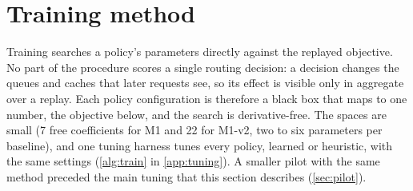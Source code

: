 %

\section{Training method}
\label{sec:training}

Training searches a policy's parameters directly against the replayed objective. No part of the
procedure scores a single routing decision: a decision changes the queues and caches that later
requests see, so its effect is visible only in aggregate over a replay. Each policy
configuration is therefore a black box that maps to one number, the objective below, and the
search is derivative-free. The spaces are small (7 free coefficients for M1 and 22 for M1-v2, two
to six parameters per baseline), and one tuning harness tunes every policy, learned or
heuristic, with the same settings (\cref{alg:train} in \cref{app:tuning}). A smaller pilot with the
same method preceded the main tuning that this section describes (\cref{sec:pilot}).

